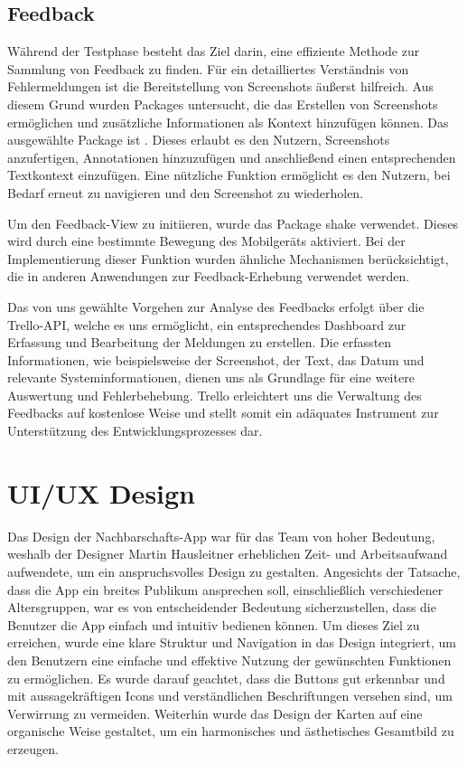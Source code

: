 \subsection{Feedback}
Während der Testphase besteht das Ziel darin, eine
effiziente Methode zur Sammlung von Feedback zu finden. Für
ein detailliertes Verständnis von Fehlermeldungen ist die
Bereitstellung von Screenshots äußerst hilfreich. Aus diesem
Grund wurden Packages untersucht, die das Erstellen von
Screenshots ermöglichen und zusätzliche Informationen als
Kontext hinzufügen können.
Das ausgewählte Package ist \cite{feedback}.
Dieses erlaubt es den Nutzern, Screenshots anzufertigen, Annotationen hinzuzufügen und anschließend einen entsprechenden Textkontext einzufügen. Eine nützliche Funktion ermöglicht es den Nutzern, bei Bedarf erneut zu navigieren und den Screenshot zu wiederholen.

Um den Feedback-View zu initiieren, wurde das Package
\cite{shake} shake verwendet.
Dieses wird durch eine bestimmte Bewegung des Mobilgeräts aktiviert. Bei der Implementierung dieser Funktion wurden ähnliche Mechanismen berücksichtigt, die in anderen Anwendungen zur Feedback-Erhebung verwendet werden.

Das von uns gewählte Vorgehen zur Analyse des Feedbacks erfolgt über die Trello-API, welche es uns ermöglicht, ein entsprechendes Dashboard zur Erfassung und Bearbeitung der Meldungen zu erstellen. Die erfassten Informationen, wie beispielsweise der Screenshot, der Text, das Datum und relevante Systeminformationen, dienen uns als Grundlage für eine weitere Auswertung und Fehlerbehebung. Trello erleichtert uns die Verwaltung des Feedbacks auf kostenlose Weise und stellt somit ein adäquates Instrument zur Unterstützung des Entwicklungsprozesses dar.


\section{UI/UX Design}
Das Design der Nachbarschafts-App war für das Team von hoher Bedeutung, weshalb der Designer Martin Hausleitner erheblichen Zeit- und Arbeitsaufwand aufwendete, um ein anspruchsvolles Design zu gestalten. Angesichts der Tatsache, dass die App ein breites Publikum ansprechen soll, einschließlich verschiedener Altersgruppen, war es von entscheidender Bedeutung sicherzustellen, dass die Benutzer die App einfach und intuitiv bedienen können. Um dieses Ziel zu erreichen, wurde eine klare Struktur und Navigation in das Design integriert, um den Benutzern eine einfache und effektive Nutzung der gewünschten Funktionen zu ermöglichen. Es wurde darauf geachtet, dass die Buttons gut erkennbar und mit aussagekräftigen Icons und verständlichen Beschriftungen versehen sind, um Verwirrung zu vermeiden. Weiterhin wurde das Design der Karten auf eine organische Weise gestaltet, um ein harmonisches und ästhetisches Gesamtbild zu erzeugen.
